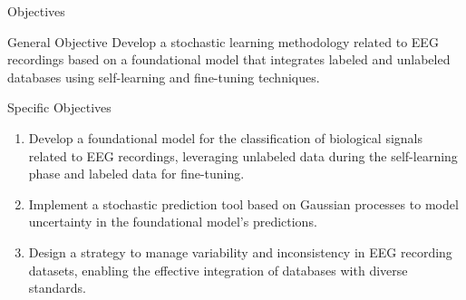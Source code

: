 \documentclass[spanish, aspectratio=169]{beamer}
\begin{document}
\begin{frame}{Objectives}
	\vspace{-0.3cm}
	\begin{block}{General Objective}
		\small
		Develop a stochastic learning methodology related to EEG recordings based on a foundational model that integrates labeled and unlabeled databases using self-learning and fine-tuning techniques.
	\end{block}
	
	\vspace{-0.1cm}
	\begin{block}{Specific Objectives}
		\small
		\begin{enumerate}
			\item Develop a foundational model for the classification of biological signals related to EEG recordings, leveraging unlabeled data during the self-learning phase and labeled data for fine-tuning.
			\item Implement a stochastic prediction tool based on Gaussian processes to model uncertainty in the foundational model's predictions.
			\item Design a strategy to manage variability and inconsistency in EEG recording datasets, enabling the effective integration of databases with diverse standards.
		\end{enumerate}
	\end{block}
\end{frame}
\end{document}
